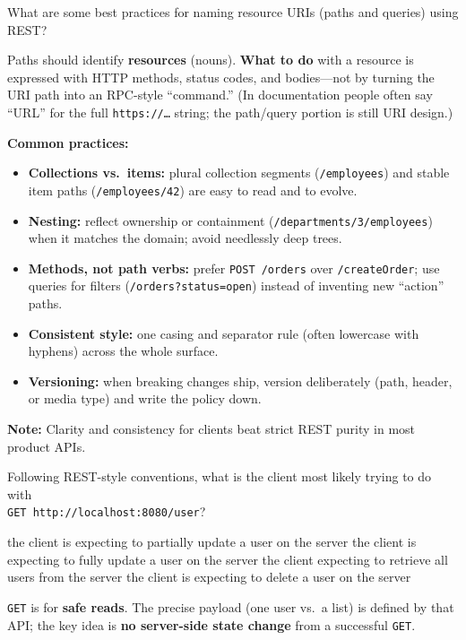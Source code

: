 \question[4]
What are some best practices for naming resource URIs (paths and queries) using REST?
\makeemptybox{1.00in}
\begin{solution}
  Paths should identify \textbf{resources} (nouns). \textbf{What to do} with a resource is expressed with HTTP methods, status codes, and bodies---not by turning the URI path into an RPC-style ``command.'' (In documentation people often say ``URL'' for the full \texttt{https://\ldots} string; the path/query portion is still URI design.)

  \noindent\textbf{Common practices:}
  \begin{itemize}
    \item \textbf{Collections vs.\ items:} plural collection segments (\texttt{/employees}) and stable item paths (\texttt{/employees/42}) are easy to read and to evolve.
    \item \textbf{Nesting:} reflect ownership or containment (\texttt{/departments/3/employees}) when it matches the domain; avoid needlessly deep trees.
    \item \textbf{Methods, not path verbs:} prefer \texttt{POST /orders} over \texttt{/createOrder}; use queries for filters (\texttt{/orders?status=open}) instead of inventing new ``action'' paths.
    \item \textbf{Consistent style:} one casing and separator rule (often lowercase with hyphens) across the whole surface.
    \item \textbf{Versioning:} when breaking changes ship, version deliberately (path, header, or media type) and write the policy down.
  \end{itemize}

  \noindent\textbf{Note:} Clarity and consistency for clients beat strict REST purity in most product APIs.
\end{solution}

\question[4]
Following REST-style conventions, what is the client most likely trying to do with\\
\texttt{GET http://localhost:8080/user}?
\begin{choices}
  \choice the client is expecting to partially update a user on the server
  \choice the client is expecting to fully update a user on the server
  \CorrectChoice the client expecting to retrieve all users from the server
  \choice the client is expecting to delete a user on the server
\end{choices}
\begin{solution}
  \texttt{GET} is for \textbf{safe reads}. The precise payload (one user vs.\ a list) is defined by that API; the key idea is \textbf{no server-side state change} from a successful \texttt{GET}.
\end{solution}



